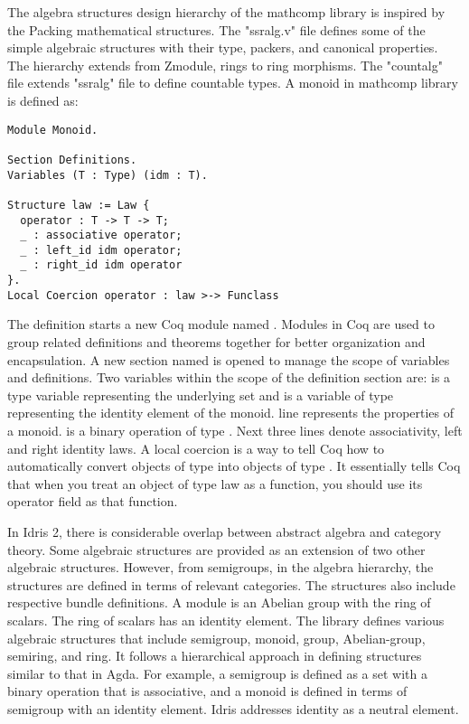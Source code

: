 The algebra structures design hierarchy of the mathcomp library is inspired by
the Packing mathematical structures. The "ssralg.v" file defines some of the
simple algebraic structures with their type, packers, and canonical properties.
The hierarchy extends from Zmodule, rings to ring morphisms. The "countalg" file
extends "ssralg" file to define countable types. A monoid in mathcomp library is defined as:

\begin{verbatim}
Module Monoid.

Section Definitions.
Variables (T : Type) (idm : T).

Structure law := Law {
  operator : T -> T -> T;
  _ : associative operator;
  _ : left_id idm operator;
  _ : right_id idm operator
}.
Local Coercion operator : law >-> Funclass
\end{verbatim}

The definition starts a new Coq module named . Modules
in Coq are used to group related definitions and theorems together for better
organization and encapsulation. A new section named
 is opened to manage the scope of variables and
definitions. Two variables within the scope of the definition section are:
 is a type variable representing the underlying set and
 is a variable of type  representing the identity element
of the monoid.  line represents
the properties of a monoid.  is a binary operation of type
. Next three lines denote associativity, left and
right identity laws.  A local coercion is a way to tell Coq how to automatically
convert objects of type  into objects of type .
It essentially tells Coq that when you treat an object of type law as a
function, you should use its operator field as that function.

In Idris 2, there is considerable overlap between abstract algebra and category
theory. Some algebraic structures are provided as an extension of two other
algebraic structures. However, from semigroups, in the algebra hierarchy, the
structures are defined in terms of relevant categories. The structures also
include respective bundle definitions. A module is an Abelian group with the
ring of scalars. The ring of scalars has an identity element. The library
defines various algebraic structures that include semigroup, monoid, group,
Abelian-group, semiring, and ring. It follows a hierarchical approach in
defining structures similar to that in Agda. For example, a semigroup is defined
as a set with a binary operation that is associative, and a monoid is defined in
terms of semigroup with an identity element. Idris addresses identity as a
neutral element.

